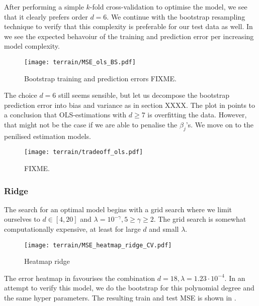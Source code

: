         After performing a simple $k$-fold cross-validation to optimise the model, we see that it clearly prefers order $d=6$. We continue with the bootstrap resampling technique to verify that this complexity is preferable for our test data as well. In  we see the expected behavoiur of the training and prediction error per increasing model complexity.
        

        \begin{figure}
            \texttt{[image: terrain/MSE\_ols\_BS.pdf]}
            \caption{Bootstrap training and prediction errors FIXME.}
            \label{fig:gc_model_complexity}
        \end{figure}

        The choice $d=6$ still seems sensible, but let us decompose the bootstrap prediction error into bias and variance as in section XXXX. The plot in  points to a conclusion that OLS-estimations with $d\geq 7$ is overfitting the data. However, that might not be the case if we are able to penalise the $\beta_j$'s. We move on to the penilised estimation models.

        \begin{figure}
            \texttt{[image: terrain/tradeoff\_ols.pdf]}
            \caption{FIXME.}
            \label{fig:gc_bias_variance_ols}
        \end{figure}


        \subsubsection{Ridge}\label{sec:gc_ridgeanalysis}


        The search for an optimal model begins with a grid search where we limit ourselves to $d\in[4, 20]$ and $\lambda=10^{-\gamma}, 5 \geq \gamma \geq 2$. The grid search is somewhat computationally expensive, at least for large $d$ and small $\lambda$.
        
        \begin{figure}
            \texttt{[image: terrain/MSE\_heatmap\_ridge\_CV.pdf]}
            \caption{Heatmap ridge}
            \label{fig:gc_gridsearch_ridge}
        \end{figure}

        The error heatmap in  favourises the combination $d=18, \lambda = 1.23\cdot 10^{-4}$. In an attempt to verify this model, we do the bootstrap for this polynomial degree and the same hyper parameters. The resulting train and test MSE is shown in .

